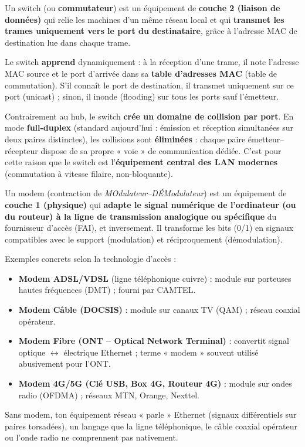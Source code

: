 \documentclass[11pt]{article}
\newcommand{\cle}[1]{{\popxbold\color{popdark}#1}}
\newcounter{popsec}
\newcounter{popsub}
\newcommand{\courssub}[1]{%
  \stepcounter{popsub}%
  \par\vspace{9pt}\noindent{\popxbold\fontsize{11.5}{13}\selectfont\color{popink}{\color{poporange}\thepopsec.\thepopsub}\hspace{6pt}#1}\par\nopagebreak\vspace{4pt}
}
\begin{document}
\courssub{Le switch (commutateur)}

\begin{definition}[Switch]
Un \cle{switch} (ou \textbf{commutateur}) est un équipement de \textbf{couche 2 (liaison de données)} qui relie les machines d'un même réseau local et qui \textbf{transmet les trames uniquement vers le port du destinataire}, grâce à l'adresse MAC de destination lue dans chaque trame.
\end{definition}

Le switch \textbf{apprend} dynamiquement : à la réception d'une trame, il note l'adresse MAC source et le port d'arrivée dans sa \textbf{table d'adresses MAC} (table de commutation). S'il connaît le port de destination, il transmet uniquement sur ce port (unicast) ; sinon, il inonde (flooding) sur tous les ports sauf l'émetteur.

\begin{propriete}
Contrairement au hub, le switch \textbf{crée un domaine de collision par port}. En mode \textbf{full-duplex} (standard aujourd'hui : émission et réception simultanées sur deux paires distinctes), les collisions sont \textbf{éliminées} : chaque paire émetteur--récepteur dispose de sa propre « voie » de communication dédiée. C'est pour cette raison que le switch est l'\textbf{équipement central des LAN modernes} (commutation à vitesse filaire, non-bloquante).
\end{propriete}

\courssub{Le modem}

\begin{definition}[Modem]
Un \cle{modem} (contraction de \emph{MOdulateur--DÉModulateur}) est un équipement de \textbf{couche 1 (physique)} qui \textbf{adapte le signal numérique de l'ordinateur (ou du routeur) à la ligne de transmission analogique ou spécifique} du fournisseur d'accès (FAI), et inversement. Il transforme les bits (0/1) en signaux compatibles avec le support (modulation) et réciproquement (démodulation).
\end{definition}

Exemples concrets selon la technologie d'accès :
\begin{itemize}
\item \textbf{Modem ADSL/VDSL} (ligne téléphonique cuivre) : module sur porteuses hautes fréquences (DMT) ; fourni par CAMTEL.
\item \textbf{Modem Câble (DOCSIS)} : module sur canaux TV (QAM) ; réseau coaxial opérateur.
\item \textbf{Modem Fibre (ONT -- Optical Network Terminal)} : convertit signal optique $\leftrightarrow$ électrique Ethernet ; terme « modem » souvent utilisé abusivement pour l'ONT.
\item \textbf{Modem 4G/5G (Clé USB, Box 4G, Routeur 4G)} : module sur ondes radio (OFDMA) ; réseaux MTN, Orange, Nexttel.
\end{itemize}
Sans modem, ton équipement réseau « parle » Ethernet (signaux différentiels sur paires torsadées), un langage que la ligne téléphonique, le câble coaxial opérateur ou l'onde radio ne comprennent pas nativement.
\end{document}
